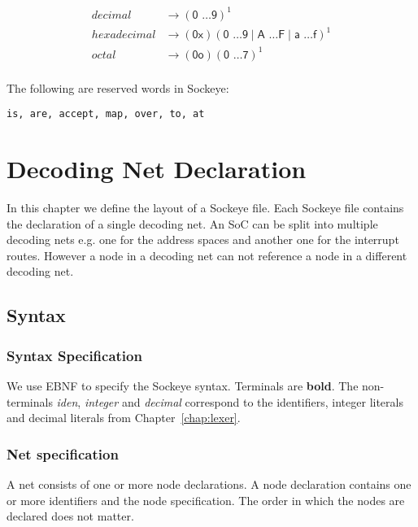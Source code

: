\documentclass[a4paper,11pt,twoside]{report}
\begin{document}
{{\begin{description}
\begin{align*}
decimal & \rightarrow (\textsf{0 \ldots 9})^{\textrm{1}}\\
hexadecimal & \rightarrow (\textsf{0x})(\textsf{0 \ldots 9} \mid \textsf{A \ldots F} \mid \textsf{a \ldots f})^{\textrm{1}}\\
octal & \rightarrow (\textsf{0o})(\textsf{0 \ldots 7})^{\textrm{1}}\\
\end{align*}

\item[Reserved words:] The following are reserved words in Sockeye:
\begin{verbatim}
is, are, accept, map, over, to, at
\end{verbatim}

\end{description}


\chapter{Decoding Net Declaration}
\label{chap:declaration}

In this chapter we define the layout of a Sockeye file. Each Sockeye file contains the declaration of a single decoding net.
An SoC can be split into multiple decoding nets e.g. one for the address spaces and another one for the interrupt routes.
However a node in a decoding net can not reference a node in a different decoding net.

\section{Syntax}

\subsection{Syntax Specification}
We use EBNF to specify the Sockeye syntax. Terminals are \textbf{bold}.
The non-terminals \textit{iden}, \textit{integer} and \textit{decimal} correspond to the identifiers, integer literals and decimal literals from Chapter~\ref{chap:lexer}.

\subsection{Net specification}
A net consists of one or more node declarations.
A node declaration contains one or more identifiers and the node specification.
The order in which the nodes are declared does not matter.

}}
\end{document}
